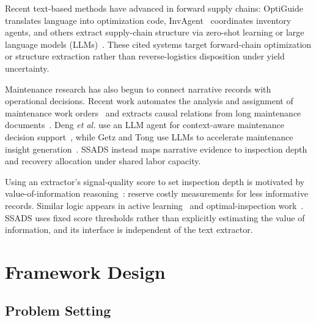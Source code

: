 \documentclass[a4paper,conference]{IEEEtran}
\begin{document}
Recent text-based methods have advanced in forward supply chains: OptiGuide~\cite{Li2023}
translates language into optimization code, InvAgent~\cite{Quan2024} coordinates
inventory agents, and others extract supply-chain structure via zero-shot learning or
large language models (LLMs)~\cite{AlMahri2026,Liu2024}. These cited systems target forward-chain
optimization or structure extraction rather than reverse-logistics disposition under
yield uncertainty.

Maintenance research has also begun to connect narrative records with operational
decisions. Recent work automates the analysis and assignment of maintenance work
orders~\cite{LiMWO2024} and extracts causal relations from long maintenance
documents~\cite{Hershowitz2024}. Deng \emph{et al.} use an LLM agent for context-aware
maintenance decision support~\cite{Deng2024}, while Getz and Tong use LLMs to
accelerate maintenance insight generation~\cite{Getz2025}. SSADS instead maps narrative
evidence to inspection depth and recovery allocation under shared labor capacity.

Using an extractor's signal-quality score to set inspection depth is motivated by
value-of-information reasoning~\cite{Howard1966}: reserve costly measurements for
less informative records. Similar logic appears in active learning~\cite{Settles2009}
and optimal-inspection work~\cite{Wang2002}. SSADS uses fixed score thresholds rather
than explicitly estimating the value of information, and its interface is independent
of the text extractor.



\section{Framework Design}

\subsection{Problem Setting}
\end{document}
